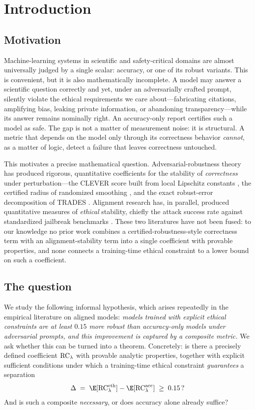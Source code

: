 \section{Introduction}
\label{sec:intro}

\subsection{Motivation}
Machine-learning systems in scientific and safety-critical domains are almost
universally judged by a single scalar: accuracy, or one of its robust variants.
This is convenient, but it is also mathematically incomplete. A model may answer a
scientific question correctly and yet, under an adversarially crafted prompt,
silently violate the ethical requirements we care about---fabricating citations,
amplifying bias, leaking private information, or abandoning transparency---while
its answer remains nominally right. An accuracy-only report certifies such a model
as safe. The gap is not a matter of measurement noise: it is structural. A metric
that depends on the model only through its correctness behavior \emph{cannot}, as a
matter of logic, detect a failure that leaves correctness untouched.

This motivates a precise mathematical question. Adversarial-robustness theory has
produced rigorous, quantitative coefficients for the stability of
\emph{correctness} under perturbation---the CLEVER score built from local Lipschitz
constants \cite{Weng2018}, the certified radius of randomized smoothing
\cite{Cohen2019}, and the exact robust-error decomposition of TRADES
\cite{Zhang2019}. Alignment research has, in parallel, produced quantitative
measures of \emph{ethical} stability, chiefly the attack success rate against
standardized jailbreak benchmarks \cite{Chao2024,Zou2023}. These two literatures
have not been fused: to our knowledge no prior work combines a
certified-robustness-style correctness term with an alignment-stability term into a
single coefficient with provable properties, and none connects a training-time
ethical constraint to a lower bound on such a coefficient.

\subsection{The question}
We study the following informal hypothesis, which arises repeatedly in the
empirical literature on aligned models: \emph{models trained with explicit ethical
constraints are at least $0.15$ more robust than accuracy-only models under
adversarial prompts, and this improvement is captured by a composite metric.} We
ask whether this can be turned into a theorem. Concretely: is there a precisely
defined coefficient $\mathrm{RC}_\lambda$ with provable analytic properties, together with
explicit sufficient conditions under which a training-time ethical constraint
\emph{guarantees} a separation
\[
  \Delta \;=\; \E[\RC_\lambda^{\eth}] - \E[\RC_\lambda^{\acc}] \;\ge\; 0.15\,?
\]
And is such a composite \emph{necessary}, or does accuracy alone already suffice?

